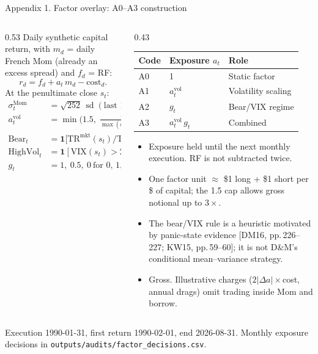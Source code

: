 \documentclass[aspectratio=169,11pt]{beamer}
\newcommand{\src}[1]{\par\vfill{\scriptsize\color{muted}\sloppy #1\par}\vskip0.05cm}
\newcommand{\rcite}[1]{{\color{muted}[#1]}}
\begin{document}
\begin{frame}[t]{Appendix 1. Factor overlay: A0--A3 construction}
\begin{columns}[T,onlytextwidth]
\begin{column}{0.53\textwidth}
\small
Daily synthetic capital return, with $m_d$ = daily French Mom (already an excess spread) and $f_d$ = RF:
\[
r_d = f_d + a_{t}\,m_d - \text{cost}_d .
\]
At the penultimate close $s_t$:
\begin{align*}
\sigma^{\text{Mom}}_t &= \sqrt{252}\,\operatorname{sd}(\text{last 126 } m_d),\\
a^{\text{vol}}_t &= \min\!\Big(1.5,\;\frac{0.10}{\max(\sigma^{\text{Mom}}_t,0.05)}\Big),\\
\text{Bear}_t &= \mathbf{1}\big[\mathrm{TR}^{\text{mkt}}(s_t)/\mathrm{TR}^{\text{mkt}}(s_{t-24})<1\big],\\
\text{HighVol}_t &= \mathbf{1}[\mathrm{VIX}(s_t)>25],\\
g_t &= 1,\ 0.5,\ 0 \ \text{for 0, 1, 2 active flags}.
\end{align*}
\end{column}
\begin{column}{0.43\textwidth}
\footnotesize
\begin{tabular}{@{}lll@{}}
\toprule
Code & Exposure $a_t$ & Role \\
\midrule
A0 & 1 & Static factor \\
A1 & $a^{\text{vol}}_t$ & Volatility scaling \\
A2 & $g_t$ & Bear/VIX regime \\
A3 & $a^{\text{vol}}_t\,g_t$ & Combined \\
\bottomrule
\end{tabular}
\vskip0.2cm
\begin{itemize}\itemsep2pt
\item Exposure held until the next monthly execution. RF is not subtracted twice.
\item One factor unit $\approx$ \$1 long + \$1 short per \$ of capital; the 1.5 cap allows gross notional up to $3\times$.
\item The bear/VIX rule is a heuristic motivated by panic-state evidence \rcite{DM16, pp.\,226--227; KW15, pp.\,59--60}; it is not D\&M's conditional mean--variance strategy.
\item Gross. Illustrative charges ($2|\Delta a|\times$cost, annual drags) omit trading inside Mom and borrow.
\end{itemize}
\end{column}
\end{columns}
\src{Execution 1990-01-31, first return 1990-02-01, end 2026-08-31. Monthly exposure decisions in \texttt{outputs/audits/factor\_decisions.csv}.}
\end{frame}
\end{document}
